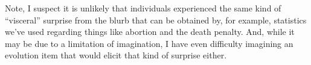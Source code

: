 Note, I suspect it is unlikely that individuals experienced the same kind of
``visceral'' surprise from the blurb that can be obtained by, for example,
statistics we've used regarding things like abortion and the death penalty. And,
while it may be due to a limitation of imagination, I have even difficulty
imagining an evolution item that would elicit that kind of surprise either.

 
